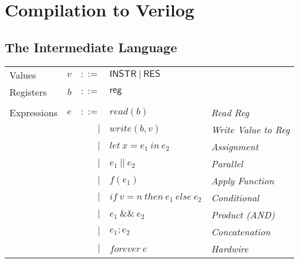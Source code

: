 \documentclass[12pt, letterpaper]{article}
\def \sysname {\textsc{GARUDA 2.0}\xspace}
\begin{document}


  \section{Compilation to Verilog}\label{sec:compile}
    \subsection{The Intermediate Language}\label{sec:compile:int}

        {\centering
        \begin{tabular}{l r r l l}
          Values        & $v$     & $::=$     & $\mathsf{INSTR\ |\ RES}$ &\\
          Registers     & $b$     & $::=$     & $\mathsf{reg}$           &\\
          \\
          Expressions & $e$ & $::=$  & $read(b)$       
                            & \textit{Read Reg}\\
                      &     & $\mid$ & $write(b,v)$    
                            & \textit{Write Value to Reg}\\
                      &     & $\mid$ & $let\ x = e_1\ in\ e_2$ 
                            & \textit{Assignment}\\  
                      &     & $\mid$ & $e_1\ ||\ e_2$ 
                            & \textit{Parallel}\\
                      &     & $\mid$ & $f(e_1)$        
                            & \textit{Apply Function} \\  
                      &     & $\mid$ & $if\ v = n\ then\ e_1\ else\ e_2$
                            & \textit{Conditional} \\
                      &     & $\mid$ & $e_1\ \&\&\ e_2$ 
                            & \textit{Product (AND)}\\
                      &     & $\mid$ & $e_1 ; e_2$
                            & \textit{Concatenation}\\
                      &     & $\mid$ & $forever\ e$ 
                            & \textit{Hardwire}
        \end{tabular}}
\end{document}
